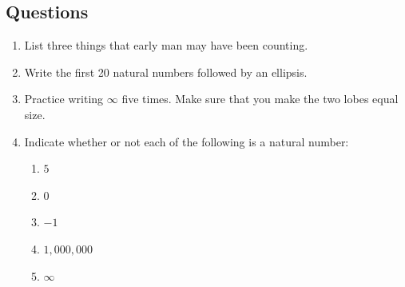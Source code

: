 \documentclass[letterpaper,12pt,fleqn]{article}
\begin{document}
\subsection*{Questions}

\begin{enumerate}
\item List three things that early man may have been counting.

  \vspace{1in}

\item Write the first 20 natural numbers followed by an ellipsis.

  \vspace{1in}

\item Practice writing $\infty$ five times. Make sure that you make the two lobes equal
  size.
  
  \vspace{1in}

\item Indicate whether or not each of the following is a natural number:
  \begin{enumerate}
  \item $5$

    \vspace{0.25in}

  \item $0$

    \vspace{0.25in}

  \item $-1$

    \vspace{0.25in}

  \item $1,000,000$

    \vspace{0.25in}

  \item $\infty$
  \end{enumerate}

\end{enumerate}
\end{document}
